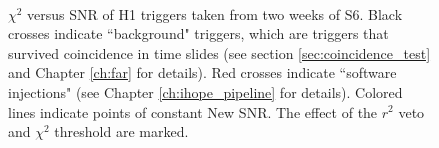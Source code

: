 \begin{figure}
\label{fig:snr_chisq}
\begin{center}
 \\
\end{center}
\caption{$\chi^2$ versus \ac{SNR} of H1 triggers taken from two weeks of \ac{S6}. Black crosses indicate ``background" triggers, which are triggers that survived coincidence in time slides (see section \ref{sec:coincidence_test} and Chapter \ref{ch:far} for details). Red crosses indicate ``software injections" (see Chapter \ref{ch:ihope_pipeline} for details). Colored lines indicate points of constant New \ac{SNR}. The effect of the $r^2$ veto and $\chi^2$ threshold are marked.}
\end{figure}

